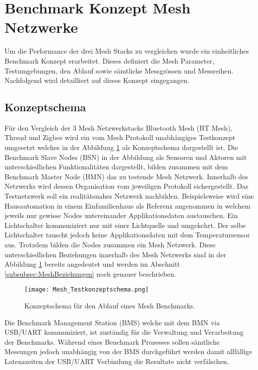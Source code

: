 \clearpage
\section{Benchmark Konzept Mesh Netzwerke}\label{sec:BenchmarkKonzeptMeshNetzwerke}

Um die Performance der drei Mesh Stacks zu vergleichen wurde ein einheitliches Benchmark Konzept erarbeitet. Dieses definiert die Mesh Parameter, Testumgebungen, den Ablauf sowie sämtliche Messgrössen und Messreihen. Nachfolgend wird detailliert auf dieses Konzept eingegangen.

\subsection{Konzeptschema}\label{subsec:KonzeptschemaMesh}

Für den Vergleich der 3 Mesh Netzwerkstacks Bluetooth Mesh (BT Mesh), Thread und Zigbee wird ein vom Mesh Protokoll unabhängiges Testkonzept umgesetzt welches in der Abbildung \ref{fig:MeshTestKonzept} als Konzeptschema dargestellt ist.
Die Benchmark Slave Nodes (BSN) in der Abbildung als Sensoren und Aktoren mit unterschiedlichen Funktionalitäten dargestellt, bilden zusammen mit dem Benchmark Master Node (BMN) das zu testende Mesh Netzwerk.
Innerhalb des Netzwerks wird dessen Organisation vom jeweiligen Protokoll sichergestellt.
Das Testnetzwerk soll ein realitätsnahes Netzwerk nachbilden.
Beispielsweise wird eine Hausautomation in einem Einfamilienhaus als Referenz angenommen in welchem jeweils nur gewisse Nodes untereinander Applikationsdaten austauschen.
Ein Lichtschalter kommuniziert nur mit einer Lichtquelle und umgekehrt.
Der selbe Lichtschalter tauscht jedoch keine Applikationsdaten mit dem Temperatursensor aus.
Trotzdem bilden die Nodes zusammen ein Mesh Netzwerk.
Diese unterschiedlichen Beziehungen innerhalb des Mesh Netzwerks sind in der Abbildung \ref{fig:MeshTestKonzept} bereits angedeutet und werden im Abschnitt \ref{subsubsec:MeshBeziehungen} noch genauer beschrieben.

\begin{figure}[h]
	\centering
	\texttt{[image: Mesh\_Testkonzeptschema.png]}
	\caption{Konzeptschema für den Ablauf eines Mesh Benchmarks.}\label{fig:MeshTestKonzept}
\end{figure}

Die Benchmark Management Station (BMS) welche mit dem BMN via USB/UART kommuniziert, ist zuständig für die Verwaltung und Verarbeitung der Benchmarks. Während eines Benchmark Prozesses sollen sämtliche Messungen jedoch unabhängig von der BMS durchgeführt werden damit allfällige Latenzzeiten der USB/UART Verbindung die Resultate nicht verfälschen.


